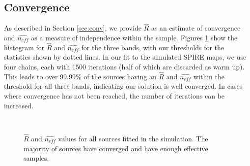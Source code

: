 \documentclass[useAMS,usenatbib]{mnras}
\begin{document}
\subsection{Convergence}
As described in Section \ref{sec:conv}, we provide $\hat{R}$ as an estimate of convergence and $\hat{n_{eff}}$ as a measure of independence within the sample. Figures \ref{fig:converg} show the histogram for $\hat{R}$ and $\hat{n_{eff}}$ for the three bands, with our thresholds for the statistics shown by dotted lines. In our fit to the simulated SPIRE maps, we use four chains, each with 1500 iterations (half of which are discarded as warm up). This leads to over 99.99\% of the sources having an $\hat{R}$ and $\hat{n_{eff}}$ within the threshold for all three bands, indicating our solution is well converged. In cases where convergence has not been reached, the number of iterations can be increased.
\begin{figure}
\\
\caption{$\hat{R}$ and $\hat{n_{eff}}$ values for all sources fitted in the simulation. The majority of sources have converged and have enough effective samples.}\label{fig:converg}
\end{figure}
\end{document}

